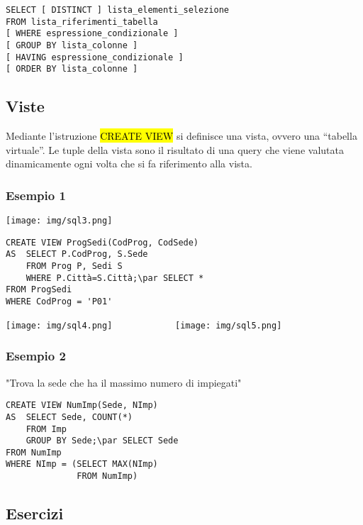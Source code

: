 \documentclass[a4paper]{article}
\begin{document}
\begin{verbatim}
SELECT [ DISTINCT ] lista_elementi_selezione
FROM lista_riferimenti_tabella
[ WHERE espressione_condizionale ]
[ GROUP BY lista_colonne ]
[ HAVING espressione_condizionale ]
[ ORDER BY lista_colonne ]
\end{verbatim}\par \subsection{Viste}
Mediante l’istruzione \hl{CREATE VIEW} si definisce una vista, ovvero una “tabella virtuale”. Le tuple della vista sono il risultato di una query che viene valutata dinamicamente ogni volta che si fa riferimento alla vista.\par \subsubsection{Esempio 1}
\begin{center}
      \texttt{[image: img/sql3.png]}
\end{center}
\begin{verbatim}
CREATE VIEW ProgSedi(CodProg, CodSede)
AS  SELECT P.CodProg, S.Sede
    FROM Prog P, Sedi S
    WHERE P.Città=S.Città;\par SELECT *
FROM ProgSedi
WHERE CodProg = 'P01'
\end{verbatim}
\begin{center}
      \texttt{[image: img/sql4.png]} \ \ \ \ \ \ \ \ \ \ \ \
      \texttt{[image: img/sql5.png]}
\end{center}\par \subsubsection{Esempio 2}
"Trova la sede che ha il massimo numero di impiegati"
\begin{verbatim}
CREATE VIEW NumImp(Sede, NImp)
AS  SELECT Sede, COUNT(*)
    FROM Imp
    GROUP BY Sede;\par SELECT Sede
FROM NumImp
WHERE NImp = (SELECT MAX(NImp)
              FROM NumImp)
\end{verbatim}\par \subsection{Esercizi}
\end{document}

